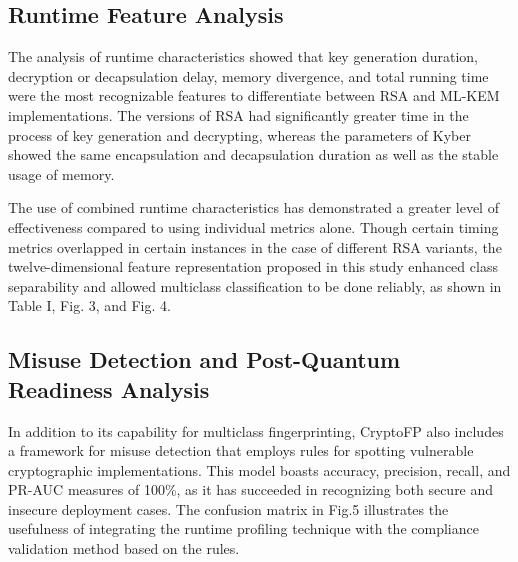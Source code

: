 \documentclass[conference]{IEEEtran}
\begin{document}
\subsection{Runtime Feature Analysis} 

The analysis of runtime characteristics showed that key generation duration, decryption or decapsulation delay, memory divergence, and total running time were the most recognizable features to differentiate between RSA and ML-KEM implementations. The versions of RSA had significantly greater time in the process of key generation and decrypting, whereas the parameters of Kyber showed the same encapsulation and decapsulation duration as well as the stable usage of memory.

The use of combined runtime characteristics has demonstrated a greater level of effectiveness compared to using individual metrics alone. Though certain timing metrics overlapped in certain instances in the case of different RSA variants, the twelve-dimensional feature representation proposed in this study enhanced class separability and allowed multiclass classification to be done reliably, as shown in Table I, Fig. 3, and Fig. 4.

\subsection{Misuse Detection and Post-Quantum Readiness Analysis}

In addition to its capability for multiclass fingerprinting, CryptoFP also includes a framework for misuse detection that employs rules for spotting vulnerable cryptographic implementations. This model boasts accuracy, precision, recall, and PR-AUC measures of 100\%, as it has succeeded in recognizing both secure and insecure deployment cases. The confusion matrix in Fig.5 illustrates the usefulness of integrating the runtime profiling technique with the compliance validation method based on the rules.
\end{document}
